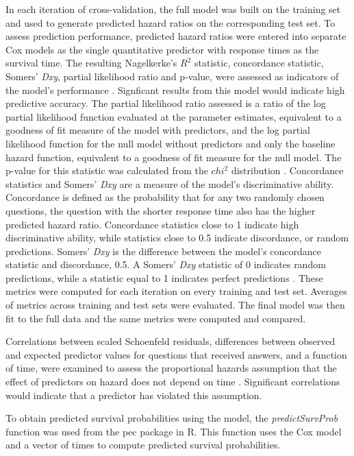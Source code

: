 \documentclass{article}
\begin{document}
In each iteration of cross-validation, the full model was built on the training set and used to generate predicted hazard ratios on the corresponding test set. To assess prediction performance, predicted hazard ratios were entered into separate Cox models as the single quantitative predictor with response times as the survival time. The resulting Nagelkerke's $R^2$ statistic, concordance statistic, Somers' \textit{Dxy}, partial likelihood ratio and p-value, were assessed as indicators of the model's performance \cite{Chen}. Signficant results from this model would indicate high predictive accuracy. The partial likelihood ratio assessed is a ratio of the log partial likelihood function evaluated at the parameter estimates, equivalent to a goodness of fit measure of the model with predictors, and the log partial likelihood function for the null model without predictors and only the baseline hazard function, equivalent to a goodness of fit measure for the null model. The p-value for this statistic was calculated from the $chi^2$ distribution \cite{find}. Concordance statistics and Somers' \textit{Dxy} are a measure of the model's discriminative ability. Concordance is defined as the probability that for any two randomly chosen questions, the question with the shorter response time also has the higher predicted hazard ratio. Concordance statistics close to 1 indicate high discriminative ability, while statistics close to 0.5 indicate discordance, or random predictions. Somers' \textit{Dxy} is the difference between the model's concordance statistic and discordance, 0.5. A Somers' \textit{Dxy} statistic of 0 indicates random predictions, while a statistic equal to 1 indicates perfect predictions \cite{Harrell2015}. These metrics were computed for each iteration on every training and test set. Averages of metrics across training and test sets were evaluated. The final model was then fit to the full data and the same metrics were computed and compared. 

Correlations between scaled Schoenfeld residuals, differences between observed and expected predictor values for questions that received answers, and a function of time, were examined to assess the proportional hazards assumption that the effect of predictors on hazard does not depend on time \cite{Grambsch1994}. Significant correlations would indicate that a predictor has violated this assumption.

To obtain predicted survival probabilities using the model, the \textit{predictSurvProb} function was used from the pec package in R. This function uses the Cox model and a vector of times to compute predicted survival probabilities. 
\end{document}

